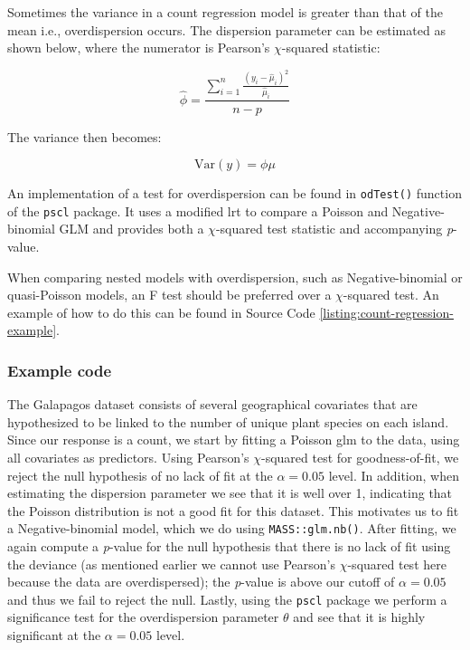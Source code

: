 \documentclass{report}
\begin{document}
Sometimes the variance in a count regression model is greater than that of the mean i.e., overdispersion occurs. The dispersion parameter can be estimated as shown below, where the numerator is Pearson's $\chi$-squared statistic:

\begin{equation}\label{eq:glm-poisson-overdispersion}
    \hat{\phi} = \frac{\sum_{i=1}^n\frac{\left(y_i - \hat{\mu}_i\right)^2}{\hat{\mu}_i}}{n-p}
\end{equation}

The variance then becomes:

\begin{equation}\label{eq:glm-poisson-overdispersed-variance}
    \text{Var}(y) = \phi\mu
\end{equation}

An implementation of a test for overdispersion can be found in \texttt{odTest()} function of the \texttt{pscl} package. It uses a modified \gls{lrt} to compare a Poisson and Negative-binomial GLM and provides both a $\chi$-squared test statistic and accompanying \textit{p}-value. 

When comparing nested models with overdispersion, such as Negative-binomial or quasi-Poisson models, an F test should be preferred over a $\chi$-squared test. An example of how to do this can be found in Source Code \ref{listing:count-regression-example}. 

\subsubsection{Example code}

The Galapagos dataset consists of several geographical covariates that are hypothesized to be linked to the number of unique plant species on each island. Since our response is a count, we start by fitting a Poisson \gls{glm} to the data, using all covariates as predictors. Using Pearson's $\chi$-squared test for goodness-of-fit, we reject the null hypothesis of no lack of fit at the $\alpha = 0.05$ level. In addition, when estimating the dispersion parameter we see that it is well over 1, indicating that the Poisson distribution is not a good fit for this dataset. This motivates us to fit a Negative-binomial model, which we do using \texttt{MASS::glm.nb()}. After fitting, we again compute a \textit{p}-value for the null hypothesis that there is no lack of fit using the deviance (as mentioned earlier we cannot use Pearson's $\chi$-squared test here because the data are overdispersed); the \textit{p}-value is above our cutoff of $\alpha = 0.05$ and thus we fail to reject the null. Lastly, using the \texttt{pscl} package we perform a significance test for the overdispersion parameter $\theta$ and see that it is highly significant at the $\alpha = 0.05$ level. 
\end{document}
